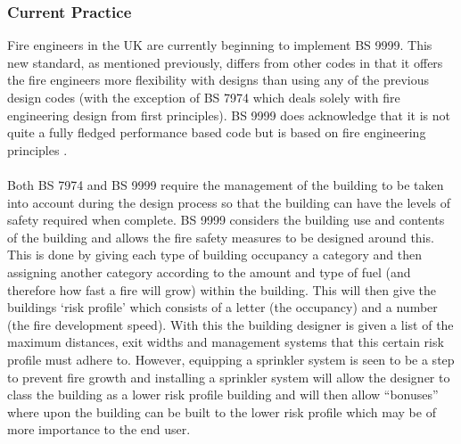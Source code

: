 \documentclass[table,a4paper,oneside]{book}
\begin{document}
\subsubsection{Current Practice}
Fire engineers in the UK are currently beginning to implement BS 9999. This new standard, as mentioned previously, differs from other codes in that it offers the fire engineers more flexibility with designs than using any of the previous design codes (with the exception of BS 7974 which deals solely with fire engineering design from first principles). BS 9999 does acknowledge that it is not quite a fully fledged performance based code but is based on fire engineering principles \citep{BSI2008}.
\\
\\
Both BS 7974 and BS 9999 require the management of the building to be taken into account \citep{BSI2003, BSI2008} during the design process so that the building can have the levels of safety required when complete. BS 9999 considers the building use and contents of the building and allows the fire safety measures to be designed around this. This is done by giving each type of building occupancy a category and then assigning another category according to the amount and type of fuel (and therefore how fast a fire will grow) within the building. This will then give the buildings `risk profile' which consists of a letter (the occupancy) and a number (the fire development speed). With this the building designer is given a list of the maximum distances, exit widths and management systems that this certain risk profile must adhere to. However, equipping a sprinkler system is seen to be a step to prevent fire growth and installing a sprinkler system will allow the designer to class the building as a lower risk profile building and will then allow ``bonuses'' where upon the building can be built to the lower risk profile which may be of more importance to the end user.
\\
\\
\end{document}
